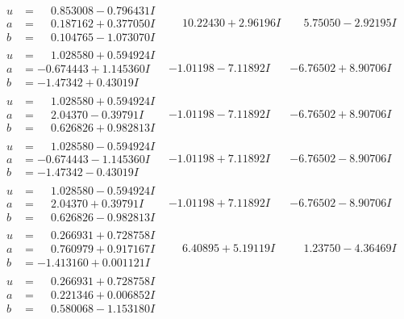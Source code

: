 \documentclass[1p]{elsarticle_modified}
\theoremstyle{definition}
\begin{document}
$$\begin{array}{c|c|c}
\begin{aligned}
u &= \phantom{-}0.853008 - 0.796431 I \\
a &= \phantom{-}0.187162 + 0.377050 I \\
b &= \phantom{-}0.104765 - 1.073070 I\end{aligned}
 & \phantom{-}10.22430 + 2.96196 I & \phantom{-}5.75050 - 2.92195 I \\ \hline\begin{aligned}
u &= \phantom{-}1.028580 + 0.594924 I \\
a &= -0.674443 + 1.145360 I \\
b &= -1.47342 + 0.43019 I\end{aligned}
 & -1.01198 - 7.11892 I & -6.76502 + 8.90706 I \\ \hline\begin{aligned}
u &= \phantom{-}1.028580 + 0.594924 I \\
a &= \phantom{-}2.04370 - 0.39791 I \\
b &= \phantom{-}0.626826 + 0.982813 I\end{aligned}
 & -1.01198 - 7.11892 I & -6.76502 + 8.90706 I \\ \hline\begin{aligned}
u &= \phantom{-}1.028580 - 0.594924 I \\
a &= -0.674443 - 1.145360 I \\
b &= -1.47342 - 0.43019 I\end{aligned}
 & -1.01198 + 7.11892 I & -6.76502 - 8.90706 I \\ \hline\begin{aligned}
u &= \phantom{-}1.028580 - 0.594924 I \\
a &= \phantom{-}2.04370 + 0.39791 I \\
b &= \phantom{-}0.626826 - 0.982813 I\end{aligned}
 & -1.01198 + 7.11892 I & -6.76502 - 8.90706 I \\ \hline\begin{aligned}
u &= \phantom{-}0.266931 + 0.728758 I \\
a &= \phantom{-}0.760979 + 0.917167 I \\
b &= -1.413160 + 0.001121 I\end{aligned}
 & \phantom{-}6.40895 + 5.19119 I & \phantom{-}1.23750 - 4.36469 I \\ \hline\begin{aligned}
u &= \phantom{-}0.266931 + 0.728758 I \\
a &= \phantom{-}0.221346 + 0.006852 I \\
b &= \phantom{-}0.580068 - 1.153180 I\end{aligned}

\end{array}$$
\end{document}
